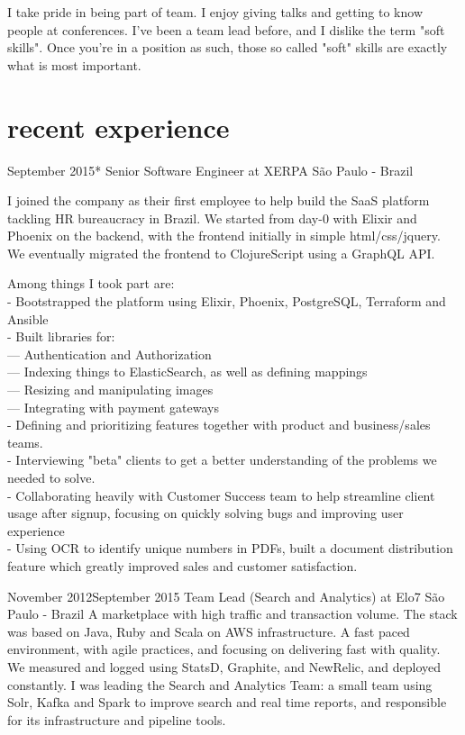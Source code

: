 \documentclass{nirev-cv}
\begin{document}
I take pride in being part of team. I enjoy giving talks and getting to know people at conferences.
I've been a team lead before, and I dislike the term "soft skills". Once you're in a position as such, those so called "soft" skills are exactly what is most important. 

\section{recent experience}
\workentry
    {September 2015}{*}
    {Senior Software Engineer at XERPA}
    {São Paulo - Brazil}
    {I joined the company as their first employee to help build the SaaS platform tackling HR bureaucracy in Brazil.
    We started from day-0 with Elixir and Phoenix on the backend, with the frontend initially in simple html/css/jquery. We eventually migrated the frontend to ClojureScript using a GraphQL API.
    
    Among things I took part are: \\ \small
    - Bootstrapped the platform using Elixir, Phoenix, PostgreSQL, Terraform and Ansible \\
    - Built libraries for: \\
    --- Authentication and Authorization \\
    --- Indexing things to ElasticSearch, as well as defining mappings \\
    --- Resizing and manipulating images \\
    --- Integrating with payment gateways \\
    - Defining and prioritizing features together with product and business/sales teams. \\
    - Interviewing "beta" clients to get a better understanding of the problems we needed to solve. \\
    - Collaborating heavily with Customer Success team to help streamline client usage after signup, focusing on quickly solving bugs and improving user experience \\
    - Using OCR to identify unique numbers in PDFs, built a document distribution feature which greatly improved sales and customer satisfaction.}

\workentry
  {November 2012}{September 2015}
  {Team Lead (Search and Analytics) at Elo7}
  {São Paulo - Brazil}
  {A marketplace with high traffic and transaction volume. The stack was based on Java, Ruby and Scala on AWS infrastructure. A fast paced environment, with agile practices, and focusing on delivering fast with quality. We measured and logged using StatsD, Graphite, and NewRelic, and deployed constantly. I was leading the Search and Analytics Team: a small team using Solr, Kafka and Spark to improve search and real time reports, and responsible for its infrastructure and pipeline tools.}
\end{document}
